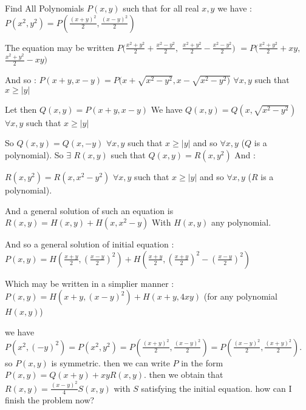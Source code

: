 \begin{solution}
	\begin{tcolorbox}Find All Polynomials $ P(x,y)$ such that for all real $ x,y$ we have :
$ P(x^{2},y^{2}) = P(\frac {(x + y)^{2}}{2},\frac {(x - y)^{2}}{2})$\end{tcolorbox}

The equation may be written $ P(\frac {x^2 + y^2}{2} + \frac {x^2 - y^2}{2},$ $ \frac {x^2 + y^2}{2} - \frac {x^2 - y^2}{2})$ $ = P(\frac {x^2 + y^2}{2} + xy,$ $ \frac {x^2 + y^2}{2} - xy)$

And so : $ P(x + y,x - y) = P(x + \sqrt {x^2 - y^2},x - \sqrt {x^2 - y^2)}$ $ \forall x,y$ such that $ x\geq |y|$

Let then $ Q(x,y) = P(x + y,x - y)$ We have $ Q(x,y) = Q(x,\sqrt {x^2 - y^2})$ $ \forall x,y$ such that $ x\geq |y|$

So $ Q(x,y) = Q(x, - y)$ $ \forall x,y$ such that $ x\geq |y|$ and so $ \forall x,y$ ($ Q$ is a polynomial). So $ \exists$ $ R(x,y)$ such that $ Q(x,y) = R(x,y^2)$ And :

$ R(x,y^2) = R(x,x^2 - y^2)$ $ \forall x,y$ such that $ x\geq |y|$ and so $ \forall x,y$ ($ R$ is a polynomial). 

And a general solution of such an equation is $ R(x,y) = H(x,y) + H(x,x^2 - y)$ With $ H(x,y)$ any polynomial.

And so a general solution of initial equation : $ P(x,y) = H(\frac {x + y}{2},(\frac {x - y}{2})^2) + H(\frac {x + y}{2},(\frac {x + y}{2})^2 - (\frac {x - y}{2})^2)$

Which may be written in a simplier manner : $ P(x,y) = H(x + y,(x - y)^2) + H(x + y,4xy)$ (for any polynomial $ H(x,y)$)
\end{solution}



\begin{solution}
	we have $ P(x^{2},(-y)^{2})=P(x^{2},y^{2})=P(\frac{(x+y)^{2}}{2},\frac{(x-y)^{2}}{2})=P(\frac{(x-y)^{2}}{2},\frac{(x+y)^{2}}{2}) $. so $ P(x,y) $ is symmetric.
then we can write $ P $ in the form $ P(x,y)=Q(x+y)+xyR(x,y) $.
then we obtain that $ R(x,y)=\frac{(x-y)^{2}}{4}S(x,y) $ with $ S $ satisfying the initial equation.
how can I finish the problem now?
\end{solution}



